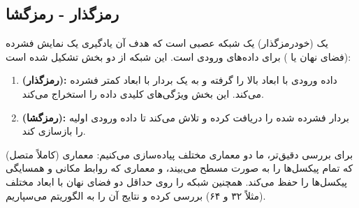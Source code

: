 \documentclass{article}
\begin{document}
\subsection{رمزگذار - رمزگشا}

یک  (خودرمزگذار) یک شبکه عصبی است که هدف آن یادگیری یک نمایش فشرده (فضای نهان یا ) برای داده‌های ورودی است. این شبکه از دو بخش تشکیل شده است:
\begin{enumerate}
	\item \textbf{ (رمزگذار):} داده ورودی با ابعاد بالا را گرفته و به یک بردار با ابعاد کمتر فشرده می‌کند. این بخش ویژگی‌های کلیدی داده را استخراج می‌کند.
	\item \textbf{ (رمزگشا):} بردار فشرده شده را دریافت کرده و تلاش می‌کند تا داده ورودی اولیه را بازسازی کند.
\end{enumerate}

برای بررسی دقیق‌تر، ما دو معماری مختلف پیاده‌سازی می‌کنیم: معماری  (کاملاً متصل) که تمام پیکسل‌ها را به صورت مسطح می‌بیند، و معماری  که روابط مکانی و همسایگی پیکسل‌ها را حفظ می‌کند. همچنین شبکه را روی حداقل دو فضای نهان با ابعاد مختلف (مثلاً ۳۲ و ۶۴) بررسی کرده و نتایج آن را به الگوریتم  می‌سپاریم.
\end{document}
